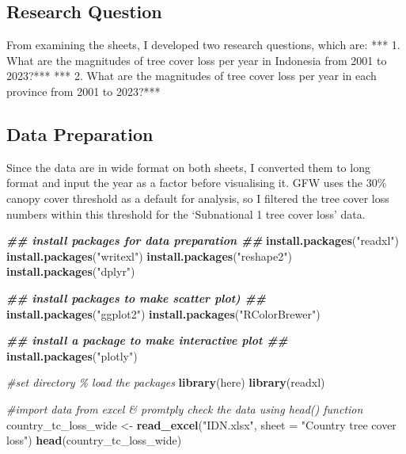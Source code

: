 \documentclass[
]{article}
\newenvironment{Shaded}{\begin{snugshade}}{\end{snugshade}}
\newcommand{\AttributeTok}[1]{\textcolor[rgb]{0.13,0.29,0.53}{#1}}
\newcommand{\CommentTok}[1]{\textcolor[rgb]{0.56,0.35,0.01}{\textit{#1}}}
\newcommand{\DocumentationTok}[1]{\textcolor[rgb]{0.56,0.35,0.01}{\textbf{\textit{#1}}}}
\newcommand{\FunctionTok}[1]{\textcolor[rgb]{0.13,0.29,0.53}{\textbf{#1}}}
\newcommand{\NormalTok}[1]{#1}
\newcommand{\OtherTok}[1]{\textcolor[rgb]{0.56,0.35,0.01}{#1}}
\newcommand{\StringTok}[1]{\textcolor[rgb]{0.31,0.60,0.02}{#1}}
\begin{document}
\subsection{Research Question}\label{research-question}

From examining the sheets, I developed two research questions, which
are: *** 1. What are the magnitudes of tree cover loss per year in
Indonesia from 2001 to 2023?*** *** 2. What are the magnitudes of tree
cover loss per year in each province from 2001 to 2023?***

\subsection{Data Preparation}\label{data-preparation}

Since the data are in wide format on both sheets, I converted them to
long format and input the year as a factor before visualising it. GFW
uses the 30\% canopy cover threshold as a default for analysis, so I
filtered the tree cover loss numbers within this threshold for the
`Subnational 1 tree cover loss' data.

\begin{Shaded}
\begin{Highlighting}[]
\DocumentationTok{\#\# install packages for data preparation \#\#}
\FunctionTok{install.packages}\NormalTok{(}\StringTok{"readxl"}\NormalTok{)}
\FunctionTok{install.packages}\NormalTok{(}\StringTok{"writexl"}\NormalTok{)}
\FunctionTok{install.packages}\NormalTok{(}\StringTok{"reshape2"}\NormalTok{)}
\FunctionTok{install.packages}\NormalTok{(}\StringTok{"dplyr"}\NormalTok{)}

\DocumentationTok{\#\# install packages to make scatter plot) \#\#}
\FunctionTok{install.packages}\NormalTok{(}\StringTok{"ggplot2"}\NormalTok{)}
\FunctionTok{install.packages}\NormalTok{(}\StringTok{"RColorBrewer"}\NormalTok{)}

\DocumentationTok{\#\# install a package to make interactive plot \#\#}
\FunctionTok{install.packages}\NormalTok{(}\StringTok{"plotly"}\NormalTok{)}
\end{Highlighting}
\end{Shaded}

\begin{Shaded}
\begin{Highlighting}[]
\CommentTok{\#set directory \% load the packages}
\FunctionTok{library}\NormalTok{(here)}
\FunctionTok{library}\NormalTok{(readxl)}


\CommentTok{\#import data from excel \& promtply check the data using head() function}
\NormalTok{country\_tc\_loss\_wide }\OtherTok{\textless{}{-}} \FunctionTok{read\_excel}\NormalTok{(}\StringTok{"IDN.xlsx"}\NormalTok{, }\AttributeTok{sheet =} \StringTok{"Country tree cover loss"}\NormalTok{)}
\FunctionTok{head}\NormalTok{(country\_tc\_loss\_wide)}
\end{Highlighting}
\end{Shaded}
\end{document}
